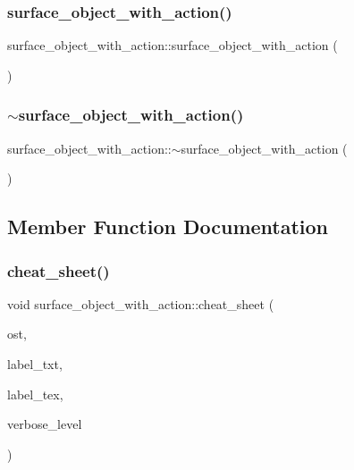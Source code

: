 \subsubsection{\texorpdfstring{surface\+\_\+object\+\_\+with\+\_\+action()}{surface\_object\_with\_action()}}
{\footnotesize\ttfamily surface\+\_\+object\+\_\+with\+\_\+action\+::surface\+\_\+object\+\_\+with\+\_\+action (\begin{DoxyParamCaption}{ }\end{DoxyParamCaption})}

\mbox{\label{classsurface__object__with__action_a037d0d8b8dd76f7d37a827aef76b48eb}} 
\subsubsection{\texorpdfstring{$\sim$surface\+\_\+object\+\_\+with\+\_\+action()}{~surface\_object\_with\_action()}}
{\footnotesize\ttfamily surface\+\_\+object\+\_\+with\+\_\+action\+::$\sim$surface\+\_\+object\+\_\+with\+\_\+action (\begin{DoxyParamCaption}{ }\end{DoxyParamCaption})}



\subsection{Member Function Documentation}
\mbox{\label{classsurface__object__with__action_a3607ebff13e6a32d719f5efb3b85fa8b}} 
\subsubsection{\texorpdfstring{cheat\+\_\+sheet()}{cheat\_sheet()}}
{\footnotesize\ttfamily void surface\+\_\+object\+\_\+with\+\_\+action\+::cheat\+\_\+sheet (\begin{DoxyParamCaption}\item[{ostream \&}]{ost,  }\item[{const \mbox{\hyperlink{galois_8h_ab6cc7b4aeb6ea31aba2b3fbfc83ff5e6}{B\+Y\+TE}} $\ast$}]{label\+\_\+txt,  }\item[{const \mbox{\hyperlink{galois_8h_ab6cc7b4aeb6ea31aba2b3fbfc83ff5e6}{B\+Y\+TE}} $\ast$}]{label\+\_\+tex,  }\item[{\mbox{\hyperlink{galois_8h_a09fddde158a3a20bd2dcadb609de11dc}{I\+NT}}}]{verbose\+\_\+level }\end{DoxyParamCaption})}

